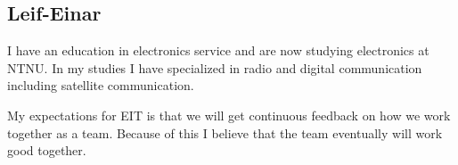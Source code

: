 \subsection{Leif-Einar}
I have an education in electronics service and are now studying electronics at NTNU. In my studies I have specialized in radio and digital communication including satellite communication. 

My expectations for EIT is that we will get continuous feedback on how we work together as a team. Because of this I believe that the team eventually will work good together.
